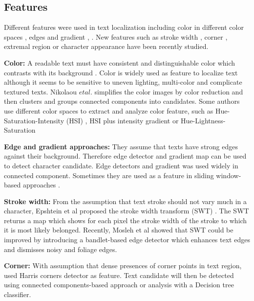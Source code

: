 \subsection{Features}


Different features were used in text localization including color in different color spaces \cite{yi.2012.TIP} \cite{Roubtsova.2012.SPIE}, edges and gradient \cite{Pillai.2013.ICCPCT}, \cite{Chen.2004.CVPR}. New features such as stroke width \cite{Subramanian.2007.ICDAR} \cite{Epshtein.2010.CVPR} , corner \cite{Zhao.2011.TIP}, extremal region \cite{Neumann.2011.ICDAR} \cite{xucheng.2013.pami} or character appearance \cite{Ye.2014.CBDAR} \cite{Yi.2013.CVIU} have been recently studied.


\textbf{Color:} A readable text must have consistent and distinguishable color which contrasts with its background \cite{Liang.2005.IJDAR}. Color is widely used as feature to localize text \cite{Jain.1998.ICPR} \cite{Wang.2003.PR} \cite{Lee.2010.ICPR} although it seems to be sensitive to uneven lighting, multi-color and complicate textured texts. Nikolaou $et al.$ \cite{Nikolaou.2009.ISTI} simplifies the color images by color reduction and then clusters and groups connected components into candidates. Some authors use different color spaces to extract and analyze color feature, such as Hue-Saturation-Intensity (HSI) \cite{Garcia.2000.ICASSP}, HSI plus intensity gradient \cite{Neumann12} or Hue-Lightness-Saturation \cite{Karatzas.2004.ICPR}


\textbf{Edge and gradient approaches:} They assume that texts have strong edges against their background. Therefore edge detector and gradient map can be used to detect character candidate. Edge detectors and gradient \cite{Ye.2003.ICICS} \cite{Pillai.2013.ICCPCT} \cite{Shiva.2008.ICPR} was used widely in connected component. Sometimes they are used as a feature in sliding window-based approaches \cite{Chen.2004.CVPR} \cite{Hanif.2008.ICPR}.


\textbf{Stroke width:} From the assumption that text stroke should not vary much in a character, Epshtein et al proposed the stroke width transform (SWT) \cite{Epshtein.2010.CVPR}. The SWT returns a map which shows for each pixel the stroke width of the stroke to which it is most likely belonged. Recently, Mosleh et al \cite{Mosleh.2012.BMVC} showed that SWT could be improved by introducing a bandlet-based edge detector which enhances text edges and dismisses noisy and foliage edges.


\textbf{Corner: } With assumption that dense presences of corner points in text region, \cite{Zhao.2011.TIP} \cite{huang.2010.ICPR} used Harris corners detector as feature. Text candidate will then be detected using connected components-based approach \cite{huang.2010.ICPR} or analysis with a Decision tree classifier.



